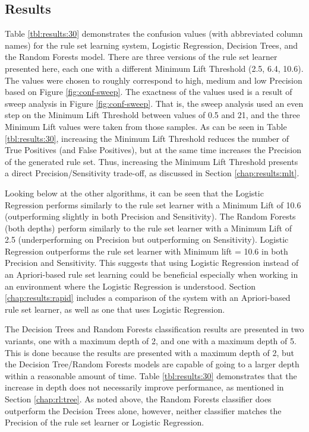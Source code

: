 \subsection{Results}


Table \ref{tbl:results:30} demonstrates the confusion values (with abbreviated column names) for the \Abb rule set learning system, Logistic Regression, Decision Trees, and the Random Forests model. 
There are three versions of the rule set learner presented here, each one with a different Minimum Lift Threshold (2.5, 6.4, 10.6). The values were chosen to roughly correspond to high, medium and low Precision based on Figure \ref{fig:conf-sweep}.
The exactness of the values used is a result of sweep analysis in Figure \ref{fig:conf-sweep}. That is, the sweep analysis used an even step on the Minimum Lift Threshold between values of 0.5 and 21, and the three Minimum Lift values were taken from those samples.
As can be seen in Table \ref{tbl:results:30}, increasing the Minimum Lift Threshold reduces the number of True Positives (and False Positives), but at the same time increases the Precision of the generated rule set. Thus, increasing the Minimum Lift Threshold presents a direct Precision/Sensitivity trade-off, as discussed in Section \ref{chap:results:mlt}.

Looking below at the other algorithms, it can be seen that the Logistic Regression performs similarly to the rule set learner with a Minimum Lift of 10.6 (outperforming slightly in both Precision and Sensitivity). The Random Forests (both depths) perform similarly to the rule set learner with a Minimum Lift of 2.5 (underperforming on Precision but outperforming on Sensitivity).
Logistic Regression outperforms the rule set learner with Minimum lift = 10.6 in both Precision and Sensitivity. This suggests that using Logistic Regression instead of an Apriori-based rule set learning could be beneficial especially when working in an environment where the Logistic Regression is understood. Section \ref{chap:results:rapid} includes a comparison of the \Abb system with an Apriori-based rule set learner, as well as one that uses Logistic Regression.

The Decision Trees and Random Forests classification results are presented in two variants, one with a maximum depth of 2, and one with a maximum depth of 5. This is done because the \Abb results are presented with a maximum depth of 2, but the Decision Tree/Random Forests models are capable of going to a larger depth within a reasonable amount of time. Table \ref{tbl:results:30} demonstrates that the increase in depth does not necessarily improve performance, as mentioned in Section \ref{chap:rl:tree}. As noted above, the Random Forests classifier does outperform the Decision Trees alone, however, neither classifier matches the Precision of the \Abb rule set learner or Logistic Regression.


